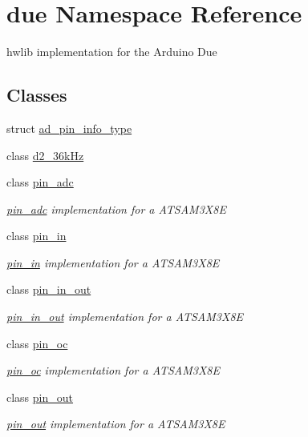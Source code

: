 \hypertarget{namespacedue}{}\section{due Namespace Reference}
\label{namespacedue}


hwlib implementation for the Arduino Due  


\subsection*{Classes}
\begin{DoxyCompactItemize}
\item 
struct \hyperlink{structdue_1_1ad__pin__info__type}{ad\+\_\+pin\+\_\+info\+\_\+type}
\item 
class \hyperlink{classdue_1_1d2__36k_hz}{d2\+\_\+36k\+Hz}
\item 
class \hyperlink{classdue_1_1pin__adc}{pin\+\_\+adc}
\begin{DoxyCompactList}\small\item\em \hyperlink{classdue_1_1pin__adc}{pin\+\_\+adc} implementation for a A\+T\+S\+A\+M3\+X8E \end{DoxyCompactList}\item 
class \hyperlink{classdue_1_1pin__in}{pin\+\_\+in}
\begin{DoxyCompactList}\small\item\em \hyperlink{classdue_1_1pin__in}{pin\+\_\+in} implementation for a A\+T\+S\+A\+M3\+X8E \end{DoxyCompactList}\item 
class \hyperlink{classdue_1_1pin__in__out}{pin\+\_\+in\+\_\+out}
\begin{DoxyCompactList}\small\item\em \hyperlink{classdue_1_1pin__in__out}{pin\+\_\+in\+\_\+out} implementation for a A\+T\+S\+A\+M3\+X8E \end{DoxyCompactList}\item 
class \hyperlink{classdue_1_1pin__oc}{pin\+\_\+oc}
\begin{DoxyCompactList}\small\item\em \hyperlink{classdue_1_1pin__oc}{pin\+\_\+oc} implementation for a A\+T\+S\+A\+M3\+X8E \end{DoxyCompactList}\item 
class \hyperlink{classdue_1_1pin__out}{pin\+\_\+out}
\begin{DoxyCompactList}\small\item\em \hyperlink{classdue_1_1pin__out}{pin\+\_\+out} implementation for a A\+T\+S\+A\+M3\+X8E \end{DoxyCompactList}\end{DoxyCompactItemize}
